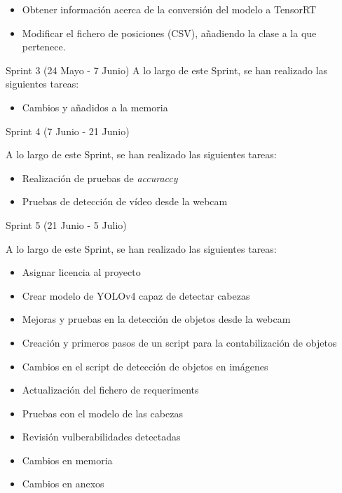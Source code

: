 \begin{itemize}
    \item Obtener información acerca de la conversión del modelo a TensorRT
    \item Modificar el fichero de posiciones (CSV), añadiendo la clase a la que pertenece.
\end{itemize}

Sprint 3 (24 Mayo - 7 Junio)
A lo largo de este Sprint, se han realizado las siguientes tareas:

\begin{itemize}
    \item Cambios y añadidos a la memoria
\end{itemize}

Sprint 4 (7 Junio - 21 Junio)

A lo largo de este Sprint, se han realizado las siguientes tareas:

\begin{itemize}
    \item Realización de pruebas de \textit{accuraccy}
    \item Pruebas de detección de vídeo desde la webcam
\end{itemize}

Sprint 5 (21 Junio - 5 Julio)

A lo largo de este Sprint, se han realizado las siguientes tareas:

\begin{itemize}
    \item Asignar licencia al proyecto
    \item Crear modelo de YOLOv4 capaz de detectar cabezas
    \item Mejoras y pruebas en la detección de objetos desde la webcam
    \item Creación y primeros pasos de un script para la contabilización de objetos
    \item Cambios en el script de detección de objetos en imágenes
    \item Actualización del fichero de requeriments
    \item Pruebas con el modelo de las cabezas
    \item Revisión vulberabilidades detectadas
    \item Cambios en memoria
    \item Cambios en anexos
\end{itemize}


